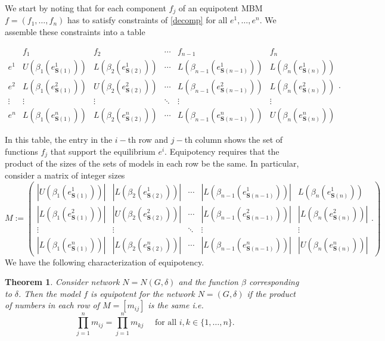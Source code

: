 \documentclass[12pt]{amsart}
\newcommand{\Sources}{\mathbf{S}}
\newtheorem{thm}{Theorem}[section]
\theoremstyle{definition}
\begin{document}
We start by noting that for each component $f_j$ of an equipotent MBM $f=(f_1, \ldots, f_n)$
has to satisfy constraints of \cref{decomp} for all $e^1, \ldots, e^n$.
We assemble these constraints into a table 

\[
\begin{array}{c|ccccc}
 & f_1 & f_2 & \cdots & f_{n-1} & f_n \\
\hline
e^1 &
U(\beta_1(e^1_{\Sources(1)})) &
L(\beta_2(e^1_{\Sources(2)})) &
\cdots &
 L(\beta_{n-1}(e^1_{\Sources(n-1)})) &
 L(\beta_n(e^1_{\Sources(n)}))
\\
e^2 &
L(\beta_1(e^2_{\Sources(1)}))&
U(\beta_2(e^2_{\Sources(2)})) &
\cdots &
L(\beta_{n-1}(e^2_{\Sources(n-1)})) &
L(\beta_n(e^2_{\Sources(n)}))
\\
\vdots & \vdots & \vdots & \ddots & \vdots & \vdots
\\
e^n &
L(\beta_1(e^n_{\Sources(1)})) &
L(\beta_2(e^n_{\Sources(2)}))&
\cdots &
L(\beta_{n-1}(e^n_{\Sources(n-1)}))&
U(\beta_n(e^n_{\Sources(n)}))
\end{array}.
\]

In this table, the entry in the $i-$th row and $j-$th column shows the set of functions $f_j$ that support the equilibrium $e^i$.
Equipotency requires that the product of the sizes of the sets of models in each row be the same. In particular, consider a matrix of integer sizes 
\[
M:= \left (
\begin{array}{ccccc}
|U(\beta_1(e^1_{\Sources(1)}))| &
|L(\beta_2(e^1_{\Sources(2)}))| &
\cdots &
 |L(\beta_{n-1}(e^1_{\Sources(n-1)}))| &
 L(\beta_n(e^1_{\Sources(n)}))
\\
|L(\beta_1(e^2_{\Sources(1)}))|&
|U(\beta_2(e^2_{\Sources(2)}))| &
\cdots &
|L(\beta_{n-1}(e^2_{\Sources(n-1)}))| &
|L(\beta_n(e^2_{\Sources(n)}))|
\\
\vdots & \vdots & \ddots & \vdots & \vdots
\\
|L(\beta_1(e^n_{\Sources(1)}))| &
|L(\beta_2(e^n_{\Sources(2)}))|&
\cdots &
|L(\beta_{n-1}(e^n_{\Sources(n-1)}))|&
|U(\beta_n(e^n_{\Sources(n)}))|
\end{array}.
\right )
\]
We have the following characterization of equipotency.

\begin{thm}\label{thm:equipotent_general}
Consider network $N=N(G,\delta)$ and the function $\beta$ corresponding to $\delta$.
Then the model $f$ is equipotent for the network $N=(G,\delta)$ if the product of numbers in each row of $M= [m_{ij}]$ is the same i.e. 
\[ \prod_{j=1}^n m_{ij} = \prod_{j=1}^n m_{kj}\quad \mbox{ for all } i,k \in \{1,\ldots, n\} .\]
\end{thm}
\end{document}
